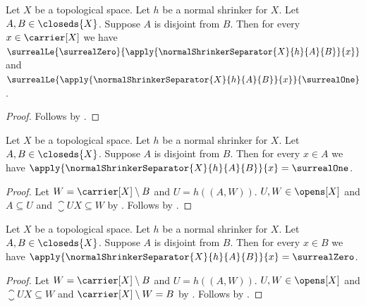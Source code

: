 \begin{theorem}\label{normal_shrinker_separator_between_zero_and_one}
    Let $X$ be a topological space.
    Let $h$ be a normal shrinker for $X$.
    Let $A,B\in\closeds{X}$.
    Suppose $A$ is disjoint from $B$.
    Then for every $x\in\carrier[X]$ we have
        $\surrealLe{\surrealZero}
            {\apply{\normalShrinkerSeparator{X}{h}{A}{B}}{x}}$ and
        $\surrealLe{\apply{\normalShrinkerSeparator{X}{h}{A}{B}}{x}}
            {\surrealOne}$.
\end{theorem}
\begin{proof}
    Follows by
        .
\end{proof}

\begin{theorem}\label{normal_shrinker_separator_one_on_first}
    Let $X$ be a topological space.
    Let $h$ be a normal shrinker for $X$.
    Let $A,B\in\closeds{X}$.
    Suppose $A$ is disjoint from $B$.
    Then for every $x\in A$ we have
        $\apply{\normalShrinkerSeparator{X}{h}{A}{B}}{x}=\surrealOne$.
\end{theorem}
\begin{proof}
    Let $W=\carrier[X]\setminus B$ and $U=h((A,W))$.
    $U,W\in\opens[X]$ and $A\subseteq U$ and
        $\closure{U}{X}\subseteq W$
        by .
    Follows by
        .
\end{proof}

\begin{theorem}\label{normal_shrinker_separator_zero_on_second}
    Let $X$ be a topological space.
    Let $h$ be a normal shrinker for $X$.
    Let $A,B\in\closeds{X}$.
    Suppose $A$ is disjoint from $B$.
    Then for every $x\in B$ we have
        $\apply{\normalShrinkerSeparator{X}{h}{A}{B}}{x}=\surrealZero$.
\end{theorem}
\begin{proof}
    Let $W=\carrier[X]\setminus B$ and $U=h((A,W))$.
    $U,W\in\opens[X]$ and $\closure{U}{X}\subseteq W$ and
        $\carrier[X]\setminus W=B$
        by .
    Follows by
        .
\end{proof}
